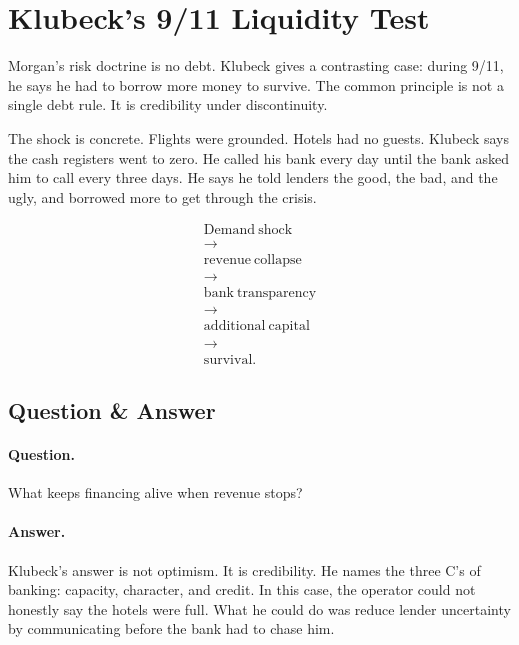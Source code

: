 \documentclass[11pt,oneside]{book}
\begin{document}
\section{Klubeck's 9/11 Liquidity Test}

Morgan's risk doctrine is no debt. Klubeck gives a contrasting case: during 9/11, he says he had to borrow more money to survive. The common principle is not a single debt rule. It is credibility under discontinuity.

The shock is concrete. Flights were grounded. Hotels had no guests. Klubeck says the cash registers went to zero. He called his bank every day until the bank asked him to call every three days. He says he told lenders the good, the bad, and the ugly, and borrowed more to get through the crisis.

\begin{equation}
\begin{gathered}
\mathrm{Demand\ shock}\\
\rightarrow\\
\mathrm{revenue\ collapse}\\
\rightarrow\\
\mathrm{bank\ transparency}\\
\rightarrow\\
\mathrm{additional\ capital}\\
\rightarrow\\
\mathrm{survival}.
\end{gathered}
\end{equation}

\subsection{Question \& Answer}

\paragraph{Question.}
What keeps financing alive when revenue stops?

\paragraph{Answer.}
Klubeck's answer is not optimism. It is credibility. He names the three C's of banking: capacity, character, and credit. In this case, the operator could not honestly say the hotels were full. What he could do was reduce lender uncertainty by communicating before the bank had to chase him.
\end{document}
